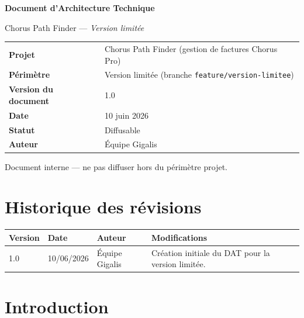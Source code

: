 \documentclass[11pt,a4paper]{article}
\newcommand{\code}[1]{\texttt{\small #1}}
\begin{document}
\begin{titlepage}
\centering
\vspace*{2.5cm}
{\Huge\bfseries\color{primary} Document d'Architecture Technique\par}
\vspace{0.6cm}
{\LARGE Chorus Path Finder --- \emph{Version limitée}\par}
\vspace{2cm}

\begin{tabular}{ll}
\toprule
\textbf{Projet} & Chorus Path Finder (gestion de factures Chorus Pro) \\
\textbf{Périmètre} & Version limitée (branche \code{feature/version-limitee}) \\
\textbf{Version du document} & 1.0 \\
\textbf{Date} & 10 juin 2026 \\
\textbf{Statut} & Diffusable \\
\textbf{Auteur} & Équipe Gigalis \\
\bottomrule
\end{tabular}

\vfill
{\small Document interne --- ne pas diffuser hors du périmètre projet.}
\end{titlepage}

\tableofcontents
\newpage

\section*{Historique des révisions}
\begin{longtable}{p{1.5cm} p{2.2cm} p{3cm} p{6.5cm}}
\toprule
\textbf{Version} & \textbf{Date} & \textbf{Auteur} & \textbf{Modifications} \\
\midrule
\endhead
1.0 & 10/06/2026 & Équipe Gigalis & Création initiale du DAT pour la version limitée. \\
\bottomrule
\end{longtable}

\section{Introduction}
\end{document}
